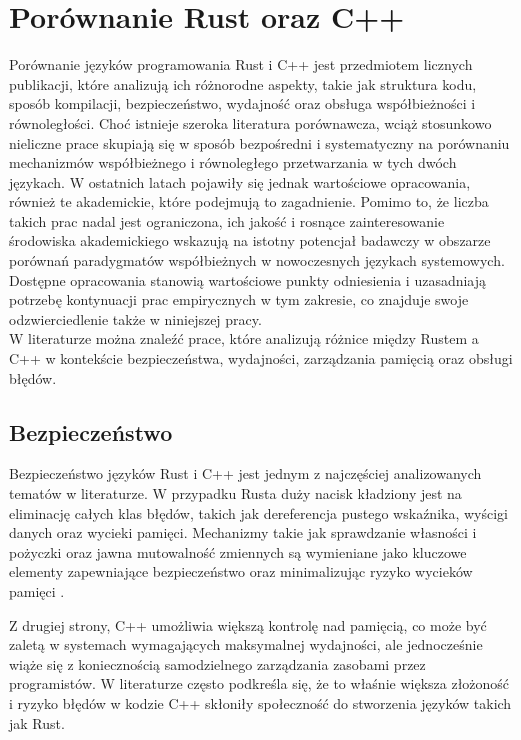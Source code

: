 \section{Porównanie Rust oraz C++}
Porównanie języków programowania Rust i C++ jest przedmiotem licznych publikacji, które analizują ich różnorodne aspekty, takie jak struktura kodu, sposób kompilacji, bezpieczeństwo, wydajność oraz obsługa współbieżności i równoległości. Choć istnieje szeroka literatura porównawcza, wciąż stosunkowo nieliczne prace skupiają się w sposób bezpośredni i systematyczny na porównaniu mechanizmów współbieżnego i równoległego przetwarzania w tych dwóch językach. W ostatnich latach pojawiły się jednak wartościowe opracowania, również te akademickie, które podejmują to zagadnienie. Pomimo to, że liczba takich prac nadal jest ograniczona, ich jakość i rosnące zainteresowanie środowiska akademickiego wskazują na istotny potencjał badawczy w obszarze porównań paradygmatów współbieżnych w nowoczesnych językach systemowych. Dostępne opracowania stanowią wartościowe punkty odniesienia i uzasadniają potrzebę kontynuacji prac empirycznych w tym zakresie, co znajduje swoje odzwierciedlenie także w niniejszej pracy. \\
W literaturze można znaleźć prace, które analizują różnice między Rustem a C++ w kontekście bezpieczeństwa, wydajności, zarządzania pamięcią oraz obsługi błędów.

\subsection{Bezpieczeństwo}
\label{Bezpieczeństwo}
Bezpieczeństwo języków Rust i C++ jest jednym z najczęściej analizowanych tematów w literaturze. W przypadku Rusta duży nacisk kładziony jest na eliminację całych klas błędów, takich jak dereferencja pustego wskaźnika, wyścigi danych oraz wycieki pamięci. Mechanizmy takie jak sprawdzanie własności i pożyczki oraz jawna mutowalność zmiennych  są wymieniane jako kluczowe elementy zapewniające bezpieczeństwo oraz minimalizując ryzyko wycieków pamięci \cite{MigratingCtoRustforMemorySafety}. 

Z drugiej strony, C++ umożliwia większą kontrolę nad pamięcią, co może być zaletą w systemach wymagających maksymalnej wydajności, ale jednocześnie wiąże się z koniecznością samodzielnego zarządzania zasobami przez programistów. W literaturze \cite{RustDifferences, RustDifferences1} często podkreśla się, że to właśnie większa złożoność i ryzyko błędów w kodzie C++ skłoniły społeczność do stworzenia języków takich jak Rust.

